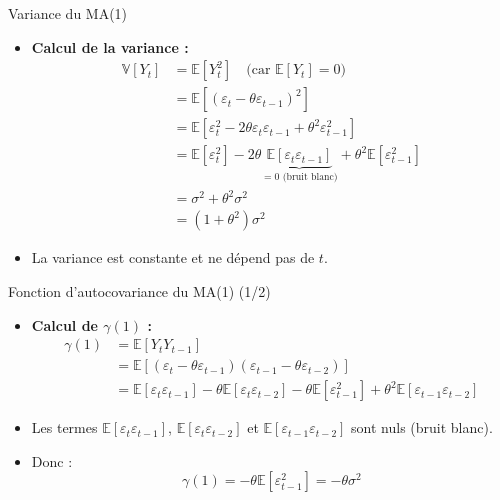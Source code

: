 \documentclass[11pt,aspectratio=169]{beamer}
\newcommand{\E}{\mathbb{E}}
\newcommand{\Var}{\mathbb{V}}
\begin{document}
\begin{frame}{Variance du MA(1)}

\begin{itemize}

\item \textbf{Calcul de la variance :}
\begin{align*}
\Var[Y_t] &= \E[Y_t^2] \quad \text{(car } \E[Y_t] = 0\text{)} \\
&= \E[(\varepsilon_t - \theta \varepsilon_{t-1})^2] \\
&= \E[\varepsilon_t^2 - 2\theta \varepsilon_t \varepsilon_{t-1} + \theta^2 \varepsilon_{t-1}^2] \\
&= \E[\varepsilon_t^2] - 2\theta \underbrace{\E[\varepsilon_t \varepsilon_{t-1}]}_{= 0 \text{ (bruit blanc)}} + \theta^2 \E[\varepsilon_{t-1}^2] \\
&= \sigma^2 + \theta^2 \sigma^2 \\
&= (1 + \theta^2) \sigma^2
\end{align*}

\item La variance est constante et ne dépend pas de $t$.

\end{itemize}
\end{frame}

\begin{frame}{Fonction d'autocovariance du MA(1) (1/2)}

\begin{itemize}

\item \textbf{Calcul de $\gamma(1)$ :}
\begin{align*}
\gamma(1) &= \E[Y_t Y_{t-1}] \\
&= \E[(\varepsilon_t - \theta \varepsilon_{t-1})(\varepsilon_{t-1} - \theta \varepsilon_{t-2})] \\
&= \E[\varepsilon_t \varepsilon_{t-1}] - \theta \E[\varepsilon_t \varepsilon_{t-2}] - \theta \E[\varepsilon_{t-1}^2] + \theta^2 \E[\varepsilon_{t-1} \varepsilon_{t-2}]
\end{align*}

\item Les termes $\E[\varepsilon_t \varepsilon_{t-1}]$, $\E[\varepsilon_t \varepsilon_{t-2}]$ et $\E[\varepsilon_{t-1} \varepsilon_{t-2}]$ sont nuls (bruit blanc).\newline

\item Donc :
\[
\gamma(1) = -\theta \E[\varepsilon_{t-1}^2] = -\theta \sigma^2
\]

\end{itemize}
\end{frame}
\end{document}
